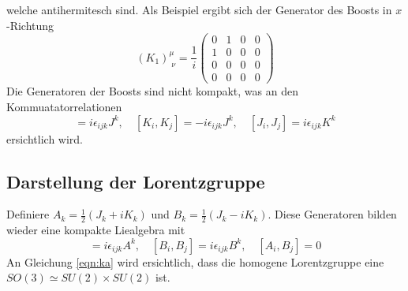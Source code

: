\documentclass[
  captions=tableheading,  %
  titlepage=firstiscover, %
]{scrartcl}
\begin{document}
welche antihermitesch sind.
Als Beispiel ergibt sich der Generator des Boosts in $x$-Richtung
\begin{equation*}
  (K_1)_{\; \nu}^{\mu} = \frac{1}{i}
  \begin{pmatrix}
    0&1&0&0\\
    1&0&0&0\\
    0&0&0&0\\
    0&0&0&0
  \end{pmatrix}
\end{equation*}
Die Generatoren der Boosts sind nicht kompakt, was an den Kommuatatorrelationen 
\begin{equation*}
  [J_i,J_j] = i \epsilon_{ijk} J^k,\quad [K_i, K_j] = - i \epsilon_{ijk} J^k, 
  \quad [J_i,J_j] = i \epsilon_{ijk} K^k
\end{equation*}
ersichtlich wird.
\subsection{Darstellung der Lorentzgruppe}
Definiere $A_k = \frac{1}{2} (J_k + i K_k)$ und $B_k = \frac{1}{2} (J_k - i K_k)$.
Diese Generatoren bilden wieder eine kompakte Liealgebra mit 
\begin{equation}
  [A_i,A_j] = i \epsilon_{ijk} A^k, \quad [B_i,B_j] = i \epsilon_{ijk} B^k, \quad [A_i,B_j] = 0 \label{eqn:ka}
\end{equation}
An Gleichung \eqref{eqn:ka} wird ersichtlich, dass die homogene Lorentzgruppe eine $SO(3) \simeq SU(2) \times SU(2)$
ist. 
\end{document}
